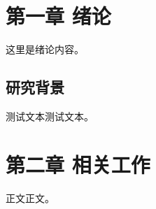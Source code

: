 \documentclass{mythesis}
\begin{document}
\makemycover

\chapter{第一章 绪论}
这里是绪论内容。

\section{研究背景}
测试文本测试文本。

\chapter{第二章 相关工作}
正文正文。
\end{document}
